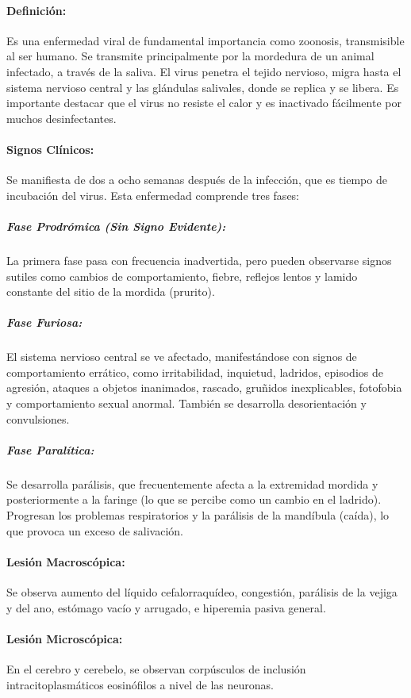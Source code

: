             \paragraph{Definición:} Es una enfermedad viral de fundamental importancia como zoonosis, transmisible al ser humano. Se transmite principalmente por la mordedura de un animal infectado, a través de la saliva. El virus penetra el tejido nervioso, migra hasta el sistema nervioso central y las glándulas salivales, donde se replica y se libera. Es importante destacar que el virus no resiste el calor y es inactivado fácilmente por muchos desinfectantes.

            \paragraph{Signos Clínicos:} Se manifiesta de dos a ocho semanas después de la infección, que es tiempo de incubación del virus. Esta enfermedad comprende tres fases:

            \subparagraph{Fase Prodrómica (Sin Signo Evidente):} La primera fase pasa con frecuencia inadvertida, pero pueden observarse signos sutiles como cambios de comportamiento, fiebre, reflejos lentos y lamido constante del sitio de la mordida (prurito).

            \subparagraph{Fase Furiosa:} El sistema nervioso central se ve afectado, manifestándose con signos de comportamiento errático, como irritabilidad, inquietud, ladridos, episodios de agresión, ataques a objetos inanimados, rascado, gruñidos inexplicables, fotofobia y comportamiento sexual anormal. También se desarrolla desorientación y convulsiones.

            \subparagraph{Fase Paralítica:} Se desarrolla parálisis, que frecuentemente afecta a la extremidad mordida y posteriormente a la faringe (lo que se percibe como un cambio en el ladrido). Progresan los problemas respiratorios y la parálisis de la mandíbula (caída), lo que provoca un exceso de salivación.

            \paragraph{Lesión Macroscópica:} Se observa aumento del líquido cefalorraquídeo, congestión, parálisis de la vejiga y del ano, estómago vacío y arrugado, e hiperemia pasiva general.

            \paragraph{Lesión Microscópica:} En el cerebro y cerebelo, se observan corpúsculos de inclusión intracitoplasmáticos eosinófilos a nivel de las neuronas.

